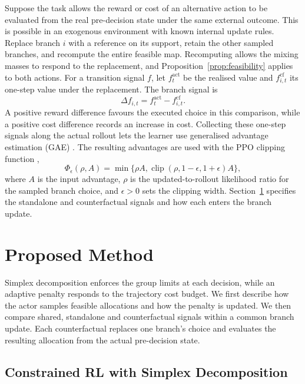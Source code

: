 \documentclass[10pt]{article}
\begin{document}
Suppose the task allows the reward or cost of an alternative action to be evaluated from the real pre-decision state under the same external outcome. This is possible in an exogenous environment with known internal update rules. Replace branch $i$ with a reference on its support, retain the other sampled branches, and recompute the entire feasible map. Recomputing allows the mixing masses to respond to the replacement, and Proposition~\ref{prop:feasibility} applies to both actions. For a transition signal $f$, let $f_t^{\mathrm{act}}$ be the realised value and $f_{i,t}^{\mathrm{cf}}$ its one-step value under the replacement. The branch signal is
\begin{equation}
  \Delta f_{i,t}=f_t^{\mathrm{act}}-f_{i,t}^{\mathrm{cf}}.
  \label{eq:general-counterfactual-credit}
\end{equation}
A positive reward difference favours the executed choice in this comparison, while a positive cost difference records an increase in cost. Collecting these one-step signals along the actual rollout lets the learner use generalised advantage estimation (GAE) \citep{schulman2015gae}. The resulting advantages are used with the PPO clipping function \citep{schulman2017},
\begin{equation}
  \Phi_\epsilon(\rho,A)
    =\min\{\rho A,\operatorname{clip}(\rho,1-\epsilon,1+\epsilon)A\},
  \label{eq:ppo-surrogate}
\end{equation}
where $A$ is the input advantage, $\rho$ is the updated-to-rollout likelihood ratio for the sampled branch choice, and $\epsilon>0$ sets the clipping width. Section~\ref{sec:learning} specifies the standalone and counterfactual signals and how each enters the branch update.

\section{Proposed Method}
\label{sec:learning}

Simplex decomposition enforces the group limits at each decision, while an adaptive penalty responds to the trajectory cost budget. We first describe how the actor samples feasible allocations and how the penalty is updated. We then compare shared, standalone and counterfactual signals within a common branch update. Each counterfactual replaces one branch's choice and evaluates the resulting allocation from the actual pre-decision state.

\subsection{Constrained RL with Simplex Decomposition}
\label{sec:feasible-rcpo}
\end{document}
